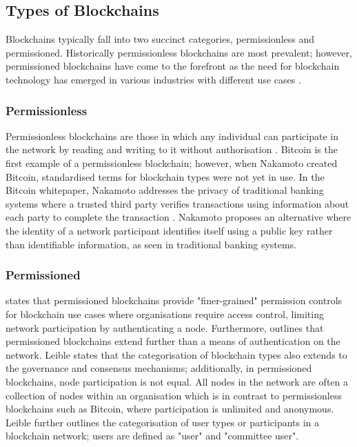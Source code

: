 \subsection{Types of Blockchains}

Blockchains typically fall into two succinct categories, permissionless and permissioned. Historically permissionless blockchains are most prevalent; however, permissioned blockchains have come to the forefront as the need for blockchain technology has emerged in various industries with different use cases \autocite{yagaBlockchainTechnologyOverview2018}. 

\subsubsection{Permissionless}

Permissionless blockchains are those in which any individual can participate in the network by reading and writing to it without authorisation \autocite{yagaBlockchainTechnologyOverview2018}.
Bitcoin is the first example of a permissionless blockchain; however, when Nakamoto created Bitcoin, standardised terms for blockchain types were not yet in use. In the Bitcoin whitepaper, Nakamoto addresses the privacy of traditional banking systems where a trusted third party verifies transactions using information about each party to complete the transaction \autocite{nakamotoBitcoinPeertoPeerElectronic2008}. Nakamoto proposes an alternative where the identity of a network participant identifies itself using a public key rather than identifiable information, as seen in traditional banking systems. 

\subsubsection{Permissioned}

\autocite{yagaBlockchainTechnologyOverview2018} states that permissioned blockchains provide "finer-grained" permission controls for blockchain use cases where organisations require access control, limiting network participation by authenticating a node. Furthermore, \autocite{leibleReviewBlockchainTechnology2019} outlines that permissioned blockchains extend further than a means of authentication on the network. Leible states that the categorisation of blockchain types also extends to the governance and consensus mechanisms; additionally, in permissioned blockchains, node participation is not equal. All nodes in the network are often a collection of nodes within an organisation which is in contrast to permissionless blockchains such as Bitcoin, where participation is unlimited and anonymous. Leible further outlines the categorisation of user types or participants in a blockchain network; users are defined as "user" and "committee user".

